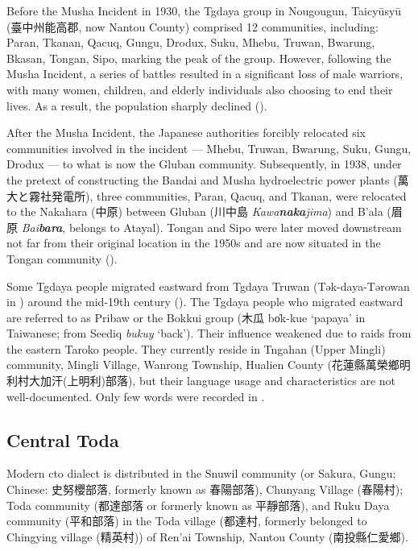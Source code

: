 Before the Musha Incident in 1930, the Tgdaya group in Nougougun, Taicyūsyū (臺中州能高郡, now Nantou County) comprised 12 communities, including: Paran, Tkanan, Qacuq, Gungu, Drodux, Suku, Mhebu, Truwan, Bwarung, Bkasan, Tongan, Sipo, marking the peak of the group. However, following the Musha Incident, a series of battles resulted in a significant loss of male warriors, with many women, children, and elderly individuals also choosing to end their lives. As a result, the population sharply declined (\cite{TengChian2023musha}).

After the Musha Incident, the Japanese authorities forcibly relocated six communities involved in the incident --- Mhebu, Truwan, Bwarung, Suku, Gungu, Drodux --- to what is now the Gluban community. Subsequently, in 1938, under the pretext of constructing the Bandai and Musha hydroelectric power plants (萬大と霧社発電所), three communities, Paran, Qacuq, and Tkanan, were relocated to the Nakahara (中原) between Gluban (川中島 \textit{Kawa\textbf{naka}jima}) and B'ala (眉原 \textit{Bai\textbf{bara}}, belongs to Atayal). Tongan and Sipo were later moved downstream not far from their original location in the 1950s and are now situated in the Tongan community (\cite{TengChian2023musha,iwanperin2005tongan}).

Some Tgdaya people migrated eastward from Tgdaya Truwan (Tək-daya-Tərowan in \cite{utsurikawaetal1935}) around the mid-19th century (\cite{liao1977Sedtheruy}). The Tgdaya people who migrated eastward are referred to as Pribaw or the Bokkui group (木瓜 bo̍k-kue `papaya' in Taiwanese; from Seediq \textit{bukuy} `back'). Their influence weakened due to raids from the eastern Taroko people. They currently reside in  Tngahan (Upper Mingli) community, Mingli Village, Wanrong Township, Hualien County (花蓮縣萬榮鄉明利村大加汗(上明利)部落), but their language usage and characteristics are not well-documented. Only few words were recorded in \textcite{tashiro1900easterntw}.

\subsection{Central Toda}

Modern \acl{cto} dialect is distributed in the Snuwil community (or Sakura, Gungu; Chinese: 史努櫻部落, formerly known as 春陽部落), Chunyang Village (春陽村); Toda community (都達部落 or formerly known as 平靜部落), and Ruku Daya community (平和部落) in the Toda village (都達村, formerly belonged to Chingying village (精英村)) of Ren'ai Township, Nantou County (南投縣仁愛鄉).

